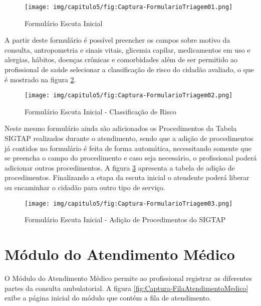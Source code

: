 \begin{figure}[H]
    \centering
     \caption{Formulário Escuta Inicial}
    \texttt{[image: img/capitulo5/fig:Captura-FormularioTriagem01.png]}
    \label{fig:Captura-FormularioTriagem01}
\end{figure}

A partir deste formulário é possível preencher os campos sobre motivo da consulta, antropometria e sinais vitais, glicemia capilar, medicamentos em uso e alergias, hábitos, doenças crônicas e comorbidades além de ser permitido ao profissional de saúde selecionar a classificação de risco do cidadão avaliado, o que é mostrado na figura \ref{fig:Captura-FormularioTriagem02}.

\begin{figure}[H]
    \centering
     \caption{Formulário Escuta Inicial - Classificação de Risco}
    \texttt{[image: img/capitulo5/fig:Captura-FormularioTriagem02.png]}
    \label{fig:Captura-FormularioTriagem02}
\end{figure}

Neste mesmo formulário ainda são adicionados os Procedimentos da Tabela SIGTAP realizados durante o atendimento, sendo que a adição de procedimentos já contidos no formulário é feita de forma automática, necessitando somente que se preencha o campo do procedimento e caso seja necessário, o profissional poderá adicionar outros procedimentos. A figura \ref{fig:Captura-FormularioTriagem03} apresenta a tabela de adição de procedimentos. Finalizando a etapa da escuta inicial o atendente poderá liberar ou encaminhar o cidadão para outro tipo de serviço.

\begin{figure}[H]
    \centering
     \caption{Formulário Escuta Inicial - Adição de Procedimentos do SIGTAP}
    \texttt{[image: img/capitulo5/fig:Captura-FormularioTriagem03.png]}
    \label{fig:Captura-FormularioTriagem03}
\end{figure}



\section{Módulo do Atendimento Médico}

O Módulo do Atendimento Médico permite ao profissional registrar as diferentes partes da consulta ambulatorial. A figura \ref{fig:Captura-FilaAtendimentoMedico} exibe a página inicial do módulo que contém a fila de atendimento.

